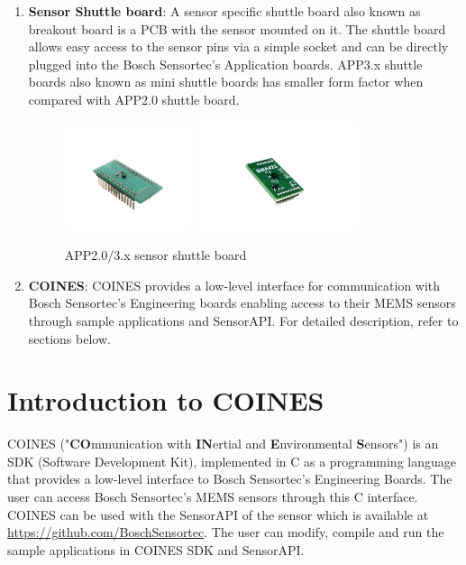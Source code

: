 \documentclass[11pt,headings=small]{scrartcl}
\begin{document}
\begin{enumerate}
	\item \textbf{Sensor Shuttle board}: A sensor specific shuttle board also known as breakout board is a PCB with the sensor mounted on it. The shuttle board allows easy access to the sensor pins via a simple socket and can be directly plugged into the Bosch Sensortec’s Application boards. APP3.x shuttle boards also known as mini shuttle boards has smaller form factor when compared with APP2.0 shuttle board.
	
	\begin{figure}[H]
		\begin{center}
			\includegraphics[width=0.35\textwidth]{coinesAPI_images/BMA222E_1.png}
			\includegraphics[width=0.45\textwidth]{coinesAPI_images/BMA423.png}
			\caption{APP2.0/3.x sensor shuttle board}
		\end{center}
	\end{figure}

	\item \textbf{COINES}: COINES provides a low-level interface for communication with Bosch Sensortec's Engineering boards enabling access to their MEMS sensors through sample applications and SensorAPI. For detailed description, refer to sections below.
\end{enumerate}

\newpage

\section{Introduction to COINES}

COINES ("\textbf{CO}mmunication with \textbf{IN}ertial and \textbf{E}nvironmental \textbf{S}ensors") is an SDK (Software Development Kit), implemented in C as a programming language that provides a low-level interface to Bosch Sensortec's Engineering Boards. The user can access Bosch Sensortec's MEMS sensors through this C interface. COINES can be used with the SensorAPI of the sensor which is available at \url{https://github.com/BoschSensortec}. The user can modify, compile and run the sample applications in COINES SDK and SensorAPI.
\end{document}
